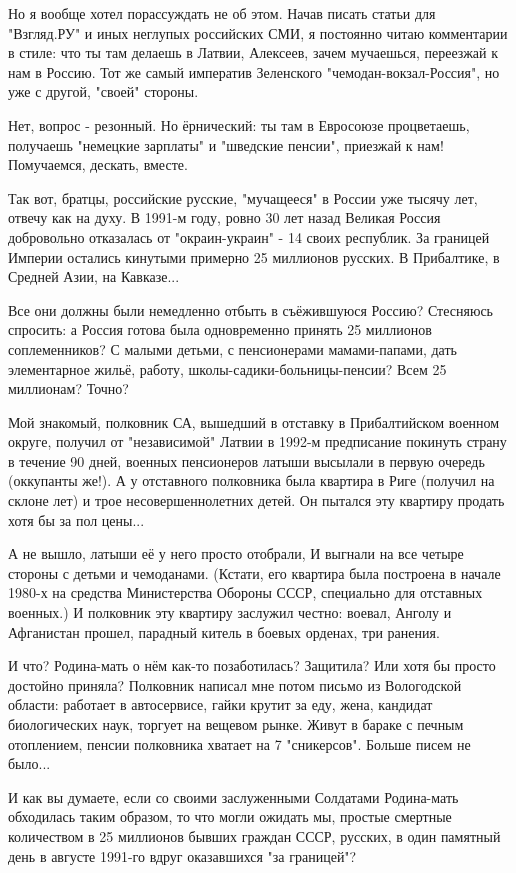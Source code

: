 Но я вообще хотел порассуждать не об этом. Начав писать статьи для "Взгляд.РУ"
и иных неглупых российских СМИ, я постоянно читаю комментарии в стиле: что ты
там делаешь в Латвии, Алексеев, зачем мучаешься, переезжай к нам в Россию. Тот
же самый императив Зеленского "чемодан-вокзал-Россия", но уже с другой, "своей"
стороны.

Нет, вопрос - резонный. Но ёрнический: ты там в Евросоюзе процветаешь,
получаешь "немецкие зарплаты" и "шведские пенсии", приезжай к нам! Помучаемся,
дескать, вместе.

Так вот, братцы, российские русские, "мучащееся" в России уже тысячу лет,
отвечу как на духу. В 1991-м году, ровно 30 лет назад Великая Россия
добровольно отказалась от "окраин-украин" - 14 своих республик. За границей
Империи остались кинутыми примерно 25 миллионов русских. В Прибалтике, в
Средней Азии, на Кавказе... 

Все они должны были немедленно отбыть в съёжившуюся Россию? Стесняюсь спросить:
а Россия готова была одновременно принять 25 миллионов соплеменников? С малыми
детьми, с пенсионерами мамами-папами, дать элементарное жильё, работу,
школы-садики-больницы-пенсии? Всем 25 миллионам? Точно?

Мой знакомый, полковник СА, вышедший в отставку в Прибалтийском военном округе,
получил от "независимой" Латвии в 1992-м предписание покинуть страну в течение
90 дней, военных пенсионеров латыши высылали в первую очередь (оккупанты же!).
А у отставного полковника была квартира в Риге (получил на склоне лет) и трое
несовершеннолетних детей. Он пытался эту квартиру продать хотя бы за пол
цены... 

А не вышло, латыши её у него просто отобрали, И выгнали на все четыре стороны с
детьми и чемоданами. (Кстати, его квартира была построена в начале 1980-х на
средства Министерства Обороны СССР, специально для отставных военных.) И
полковник эту квартиру заслужил честно: воевал, Анголу и Афганистан прошел,
парадный китель в боевых орденах, три ранения. 

И что? Родина-мать о нём как-то позаботилась? Защитила? Или хотя бы просто
достойно приняла? Полковник написал мне потом письмо из Вологодской области:
работает в автосервисе, гайки крутит за еду, жена, кандидат биологических наук,
торгует на вещевом рынке. Живут в бараке с печным отоплением, пенсии полковника
хватает на 7 "сникерсов". Больше писем не было... 

И как вы думаете, если со своими заслуженными Солдатами Родина-мать обходилась
таким образом, то что могли ожидать мы, простые смертные количеством в 25
миллионов бывших граждан СССР, русских, в один памятный день в августе 1991-го
вдруг оказавшихся "за границей"? 


